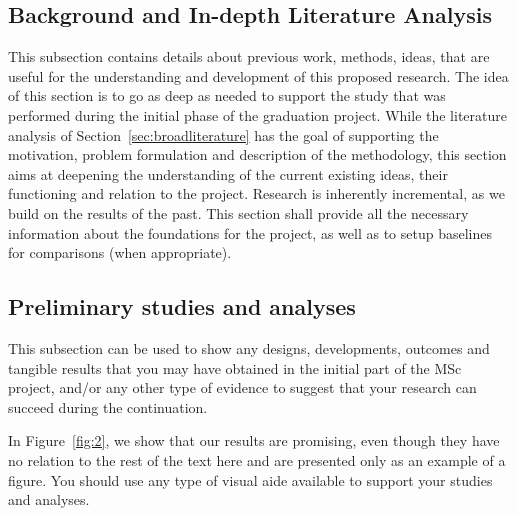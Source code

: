 \documentclass{article}
\begin{document}
\subsection{Background and In-depth Literature Analysis}\label{sec:background}

This subsection contains details about previous work, methods, ideas, that are useful for the understanding and development of this proposed research. The idea of this section is to go as deep as needed to support the study that was performed during the initial phase of the graduation project. While the literature analysis of Section~\ref{sec:broadliterature} has the goal of supporting the motivation, problem formulation and description of the methodology, this section aims at deepening the understanding of the current existing ideas, their functioning and relation to the project. Research is inherently incremental, as we build on the results of the past. This section shall provide all the necessary information about the foundations for the project, as well as to setup baselines for comparisons (when appropriate).

\subsection{Preliminary studies and analyses}

This subsection can be used to show any designs, developments, outcomes and tangible results that you may have obtained in the initial part of the MSc project, and/or any other type of evidence to suggest that your research can succeed during the continuation.

In Figure~\ref{fig:2}, we show that our results are promising, even though they have no relation to the rest of the text here and are presented only as an example of a figure. You should use any type of visual aide available to support your studies and analyses.
\end{document}
